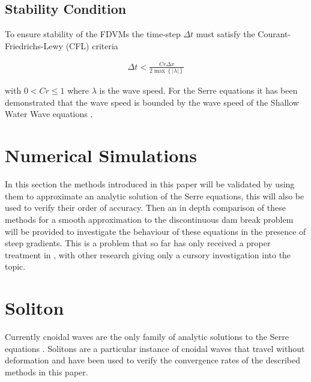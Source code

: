 \documentclass[SingleSpace,12pt,Journal]{Serre_ASCE}
\begin{document}
\subsection{Stability Condition} 
To ensure stability of the FDVMs the time-step $\Delta t$ must satisfy the Courant-Friedrichs-Lewy (CFL) criteria \cite{Harten-etal-1983-357}

\begin{gather}
\label{eq:CFL}
\Delta t < \frac{Cr \Delta x}{2\max \left\lbrace |\lambda| \right\rbrace}
\end{gather}

 with $0<Cr\le 1$ where $\lambda$ is the wave speed. For the Serre equations it has been demonstrated that the wave speed is bounded by the wave speed of the Shallow Water Wave equations \cite{Hank-etal-2010-2034}.

\section{Numerical Simulations}
\label{section:Numerical Simulations}
In this section the methods introduced in this paper will be validated by using them to approximate an analytic solution of the Serre equations, this will also be used to verify their order of accuracy. Then an in depth comparison of these methods for a smooth approximation to the discontinuous dam break problem will be provided to investigate the behaviour of these equations in the presence of steep gradients. This is a problem that so far has only received a proper treatment in \cite{El-etal-2006}, with other research giving only a cursory investigation into the topic. 

\section{Soliton}
\label{section:Convergence Rate}
Currently cnoidal waves are the only family of analytic solutions to the Serre equations \cite{Carter-Cienfuegos-2010-259}. Solitons are a particular instance of cnoidal waves that travel without deformation and have been used to verify the convergence rates of the described methods in this paper. 
\end{document}
